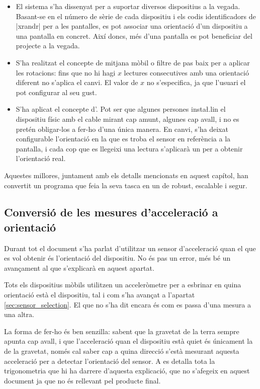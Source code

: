\begin{itemize}
    \item El sistema s'ha dissenyat per a suportar diversos dispositius a la
    vegada. Basant-se en el número de sèrie de cada dispositiu i els codis
    identificadors de \ord|xrandr| per a les pantalles, es pot associar una
    orientació d'un dispositiu a una pantalla en concret. Així doncs, més
    d'una pantalla es pot beneficiar del projecte a la vegada.
    \item S'ha realitzat el concepte de mitjana mòbil o filtre de pas baix per
    a aplicar les rotacions: fins que no hi hagi $x$ lectures consecutives amb
    una orientació diferent no s'aplica el canvi. El valor de $x$ no
    s'especifica, ja que l'usuari el pot configurar al seu gust.
    \item S'ha aplicat el concepte d'. Pot ser que algunes persones
    insta\l.lin el dispositiu físic amb el cable mirant cap amunt, algunes cap
    avall, i no es pretén obligar-los a fer-ho d'una única manera. En canvi,
    s'ha deixat configurable l'orientació en la que es troba el sensor en
    referència a la pantalla, i cada cop que es llegeixi una lectura s'aplicarà
    un  per a obtenir l'orientació real.
\end{itemize}

Aquestes millores, juntament amb els detalls mencionats en aquest capítol, han
convertit un programa que feia la seva tasca en un de robust, escalable i segur.

\subsection{Conversió de les mesures d'acceleració a orientació}

Durant tot el document s'ha parlat d'utilitzar un sensor d'acceleració quan el
que es vol obtenir és l'orientació del dispositiu. No és pas un error, més bé
un avançament al que s'explicarà en aquest apartat.

Tots els dispositius mòbils utilitzen un acceleròmetre per a esbrinar en quina
orientació està el dispositiu, tal i com s'ha avançat a l'apartat
\ref{sec:sensor_selection}. El que no s'ha dit encara és com es passa d'una
mesura a una altra.

La forma de fer-ho és ben senzilla: sabent que la gravetat de la terra sempre
apunta cap avall, i que l'acceleració quan el dispositiu està quiet és únicament
la de la gravetat, només cal saber cap a quina direcció s'està mesurant aquesta
acceleració per a detectar l'orientació del sensor. A \cite{PedleyTilt} es
detalla tota la
trigonometria que hi ha darrere d'aquesta explicació, que no s'afegeix en aquest
document ja que no és rellevant pel producte final.

